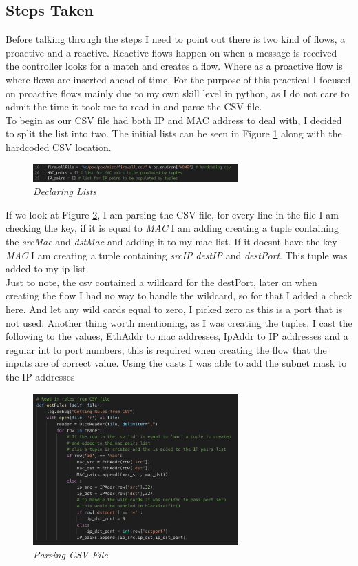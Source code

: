 \subsection{Steps Taken}
Before talking through the steps I need to point out there is two kind of flows, a proactive and a reactive. Reactive flows happen on when a message is received the controller looks for a match and creates a flow. Where as a proactive flow is where flows are inserted ahead of time. For the purpose of this practical I focused on proactive flows mainly due to my own skill level in python, as I do not care to admit the time it took me to read in and parse the CSV file.
\\To begin as our CSV file had both IP and MAC address to deal with, I decided to split the list into two. The initial lists can be seen in Figure \ref{img:p1} along with the hardcoded CSV location.
\begin{figure}[!ht]
\centering
\includegraphics*[width=0.7\textwidth]{images/p1.png}
\caption{\em Declaring Lists}
\label{img:p1}
\end{figure}
If we look at Figure \ref{img:p2}, I am parsing the CSV file, for every line in the file I am checking the key, if it is equal to \textit{MAC} I am adding creating a tuple containing the \textit{srcMac} and \textit{dstMac} and adding it to my mac list. If it doesnt have the key \textit{MAC} I am creating a tuple containing \textit{srcIP} \textit{destIP} and \textit{destPort}. This tuple was added to my ip list.
\\Just to note, the csv contained a wildcard for the destPort, later on when creating the flow I had no way to handle the wildcard, so for that I added a check here. And let any wild cards equal to zero, I picked zero as this is a port that is not used. Another thing worth mentioning, as I was creating the tuples, I cast the following to the values, EthAddr to mac addresses, IpAddr to IP addresses and a regular int to port numbers, this is required when creating the flow that the inputs are of correct value. Using the casts I was able to add the subnet mask to the IP addresses
\begin{figure}[!ht]
\centering
\includegraphics*[width=0.7\textwidth]{images/p2.png}
\caption{\em Parsing CSV File}
\label{img:p2}
\end{figure}
